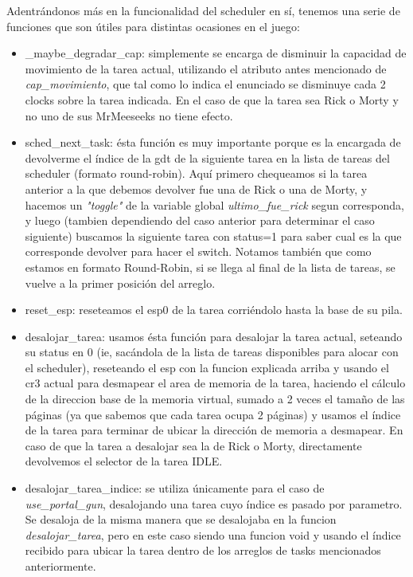 Adentrándonos más en la funcionalidad del scheduler en sí, tenemos una serie de funciones
que son útiles para distintas ocasiones en el juego:
\begin{itemize}
    \item _maybe_degradar_cap: simplemente se encarga de disminuir la capacidad de movimiento de la tarea
    actual, utilizando el atributo antes mencionado de \emph{cap_movimiento}, que tal como lo indica el enunciado
    se disminuye cada 2 clocks sobre la tarea indicada. En el caso de que la tarea sea Rick o Morty y no
    uno de sus MrMeeseeks no tiene efecto.
    \item sched_next_task: ésta función es muy importante porque es la encargada de devolverme
    el índice de la gdt de la siguiente tarea en la lista de tareas del scheduler (formato round-robin).
    Aquí primero chequeamos si la tarea anterior a la que debemos devolver fue una de Rick
o una de Morty, y hacemos un \emph{"toggle"} de la variable global \emph{ultimo_fue_rick} segun corresponda, y luego
(tambien dependiendo del caso anterior para determinar el caso siguiente) buscamos la siguiente tarea con
status=1 para saber cual es la que corresponde devolver para hacer el switch. Notamos también que 
como estamos en formato Round-Robin, si se llega al final de la lista de tareas, se vuelve a la primer
posición del arreglo.
    \item reset_esp: reseteamos el esp0 de la tarea corriéndolo hasta la base de su pila.
    \item desalojar_tarea: usamos ésta función para desalojar la tarea actual, seteando su
status en 0 (ie, sacándola de la lista de tareas disponibles para alocar con el scheduler), reseteando
el esp con la funcion explicada arriba y usando el cr3 actual para desmapear el area de memoria
de la tarea, haciendo el cálculo de la direccion base de la memoria virtual, sumado a 2 veces el 
tamaño de las páginas (ya que sabemos que cada tarea ocupa 2 páginas) y usamos el índice de la tarea
para terminar de ubicar la dirección de memoria a desmapear. En caso de que la tarea a desalojar
sea la de Rick o Morty, directamente devolvemos el selector de la tarea IDLE.
    \item desalojar_tarea_indice: se utiliza únicamente para el caso de \emph{use_portal_gun}, desalojando una tarea
cuyo índice es pasado por parametro. Se desaloja de la misma manera que se desalojaba en la funcion
\emph{desalojar_tarea}, pero en este caso siendo una funcion void y usando el índice recibido para ubicar la
tarea dentro de los arreglos de tasks mencionados anteriormente.
\end{itemize}